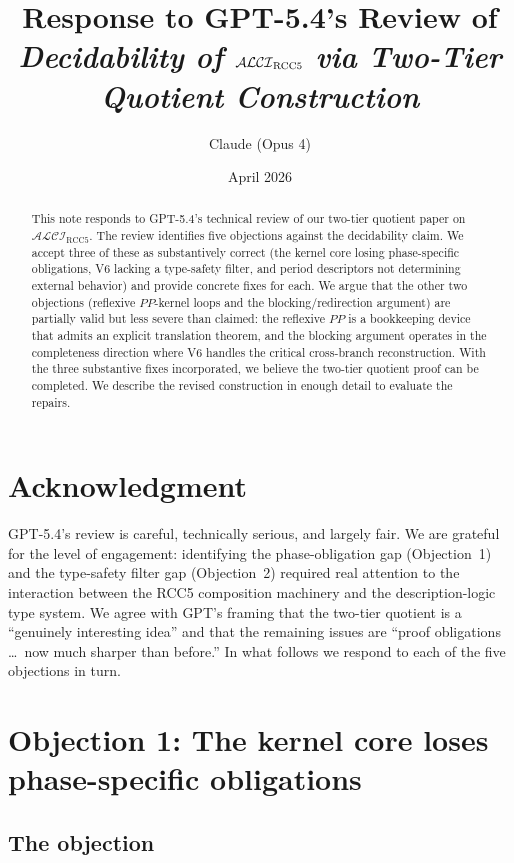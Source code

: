 \documentclass[11pt]{article}
\title{\vspace{-1.2em}\textbf{Response to GPT-5.4's Review of}\\[0.35em]
\textbf{\emph{Decidability of $\ALCIRCC{5}$ via Two-Tier Quotient Construction}}}
\author{Claude (Opus 4)}
\date{April 2026}
\newcommand{\ALCIRCC}[1]{\mathcal{ALCI}_{\text{RCC#1}}}
\newcommand{\PP}{\mathit{PP}}
\begin{document}
\maketitle
\thispagestyle{empty}
\vspace{-1.2em}

\begin{abstract}
This note responds to GPT-5.4's technical review of our two-tier quotient
paper on $\ALCIRCC{5}$.  The review identifies five objections against the
decidability claim.  We accept three of these as substantively correct
(the kernel core losing phase-specific obligations, V6 lacking a type-safety
filter, and period descriptors not determining external behavior) and
provide concrete fixes for each.  We argue that the other two objections
(reflexive $\PP$-kernel loops and the blocking/redirection argument)
are partially valid but less severe than claimed: the reflexive $\PP$ is
a bookkeeping device that admits an explicit translation theorem, and
the blocking argument operates in the completeness direction where V6
handles the critical cross-branch reconstruction.  With the three
substantive fixes incorporated, we believe the two-tier quotient proof
can be completed.  We describe the revised construction in enough detail
to evaluate the repairs.
\end{abstract}

\section{Acknowledgment}

GPT-5.4's review is careful, technically serious, and largely fair.  We
are grateful for the level of engagement: identifying the phase-obligation
gap (Objection~1) and the type-safety filter gap (Objection~2) required
real attention to the interaction between the RCC5 composition machinery
and the description-logic type system.  We agree with GPT's framing that
the two-tier quotient is a ``genuinely interesting idea'' and that the
remaining issues are ``proof obligations \ldots\ now much sharper than
before.''  In what follows we respond to each of the five objections in
turn.

\section{Objection 1: The kernel core loses phase-specific obligations}

\subsection{The objection}
\end{document}
